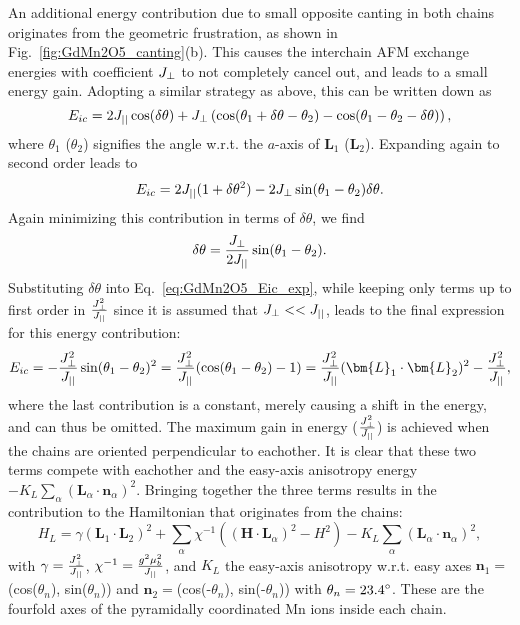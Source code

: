 An additional energy contribution due to small opposite canting in both chains originates from the geometric frustration, as shown in Fig.~\ref{fig:GdMn2O5_canting}(b). This causes the interchain AFM exchange energies with coefficient $J_{\perp}$ to not completely cancel out, and leads to a small energy gain.
Adopting a similar strategy as above, this can be written down as
\begin{equation}
	E_{ic} = 2 J_{||} \cos(\delta \theta) + J_{\perp} \left(\cos(\theta_1 + \delta \theta - \theta_2) - \cos(\theta_1 - \theta_2 -\delta \theta)\right),
\end{equation}
where $\theta_1$ ($\theta_2$) signifies the angle w.r.t. the $a$-axis of $\bm{L}_1$ ($\bm{L}_2$).
Expanding again to second order leads to
\begin{equation}
	E_{ic} = 2 J_{||} ( 1+ \delta \theta^2) - 2 J_{\perp} \sin(\theta_1 - \theta_2)\delta \theta. \label{eq:GdMn2O5_Eic_exp}
\end{equation}
Again minimizing this contribution in terms of $\delta \theta$, we find
\begin{equation}
	\delta \theta = \frac{J_{\perp}}{2 J_{||}} \sin(\theta_1 - \theta_2).
\end{equation}
Substituting $\delta \theta$ into Eq.~\eqref{eq:GdMn2O5_Eic_exp}, while keeping only terms up to first order in $\frac{J_{\perp}^2}{J_{||}}$ since it is assumed that $J_{\perp} << J_{||}$, leads to the final expression for this energy contribution:
\begin{equation}
	E_{ic} = -\frac{\Jperp^2}{\Jpar}\sin(\theta_1 - \theta_2)^2 =  \frac{\Jperp^2}{\Jpar}(\cos(\theta_1 - \theta_2) - 1) = \frac{\Jperp^2}{\Jpar}(\bm{L}_1 \cdot \bm{L}_2)^2 - \frac{\Jperp^2}{\Jpar},
\end{equation}
where the last contribution is a constant, merely causing a shift in the energy, and can thus be omitted.
The maximum gain in energy ($\frac{J_{\perp}^2}{J_{||}}$) is achieved when the chains are oriented perpendicular to eachother.
It is clear that these two terms compete with eachother and the easy-axis anisotropy energy $-K_L\sum_\alpha(\bm{L}_\alpha\cdot \bm{n}_\alpha)^2$.
Bringing together the three terms results in the contribution to the Hamiltonian that originates from the chains:
\begin{equation}
	H_L = \gamma(\bm{L}_1\cdot \bm{L}_2)^2
    +\sum_{\alpha}\chi^{-1}((\bm{H}\cdot \bm{L}_\alpha)^2-H^2)
    -K_L\sum_\alpha(\bm{L}_\alpha\cdot \bm{n}_\alpha)^2\label{eq:GdMn2O5_hami_1},
\end{equation}
with $\gamma = \frac{J_{\perp}^2}{J_{||}}$, $\chi^{-1} = \frac{g^2\mu_b^2}{J_{||}}$, and $K_L$ the easy-axis anisotropy w.r.t. easy axes $\bm{n}_1=$(cos($\theta_n$), sin($\theta_n$)) and $\bm{n}_2=$(cos(-$\theta_n$), sin(-$\theta_n$)) with $\theta_n = \rm{23.4}^\circ$. These are the fourfold axes of the pyramidally coordinated Mn ions inside each chain.

